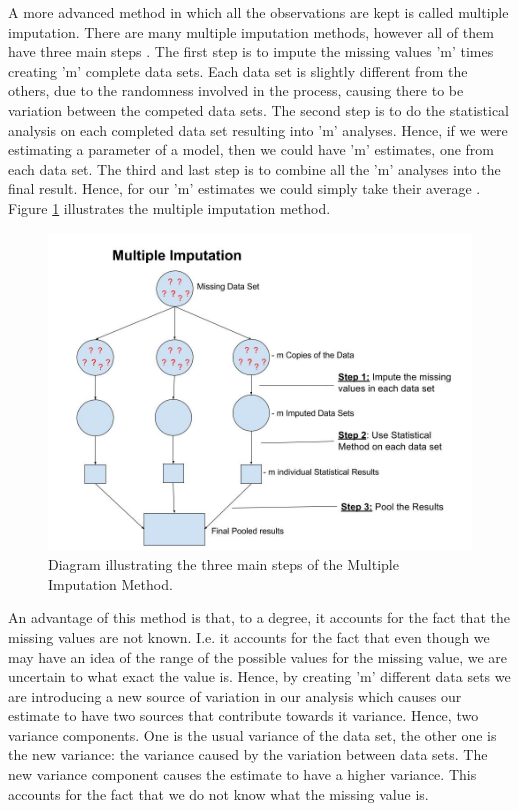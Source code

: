 \documentclass[fleqn,10pt]{wlscirep}\usepackage[]{graphicx}\usepackage[]{color}
\begin{document}
A more advanced method in which all the observations are kept is called multiple imputation. There are many multiple imputation methods, however all of them have three main steps \cite{dong2013principled}. The first step is to impute the missing values 'm' times creating 'm' complete data sets. Each data set is slightly different from the others, due to the randomness involved in the process, causing there to be variation between the competed data sets. The second step is to do the statistical analysis on each completed data set resulting into 'm' analyses. Hence, if we were estimating a parameter of a model, then we could have 'm' estimates, one from each data set. The third and last step is to combine all the 'm' analyses into the final result. Hence, for our 'm' estimates we could simply take their average \cite{yuan2010multiple, dong2013principled}. Figure \ref{fig:Faizan's_mi_fig} illustrates the multiple imputation method. 


\begin{figure}[H]
\centering
\includegraphics[width=\linewidth]{Faizan's_mi_fig}
\caption{Diagram illustrating the three main steps of the Multiple Imputation Method.}
\label{fig:Faizan's_mi_fig}
\end{figure}


An advantage of this method is that, to a degree, it accounts for the fact that the missing values are not known. I.e. it accounts for the fact that even though we may have an idea of the range of the possible values for the missing value, we are uncertain to what exact the value is. Hence, by creating 'm' different data sets we are introducing a new source of variation in our analysis which causes our estimate to have two sources that contribute towards it variance. Hence, two variance components. One is the usual variance of the data set, the other one is the new variance: the variance caused by the variation between data sets. The new variance component causes the estimate to have a higher variance. This accounts for the fact that we do not know what the missing value is. 
\end{document}
